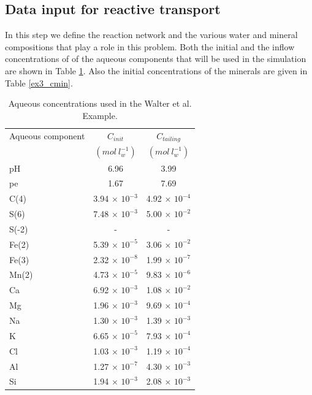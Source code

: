 \subsection[Data input for reactive transport]{Data input for reactive transport}

In this step we define the reaction network and the various water and mineral compositions that play a role in this problem. Both the initial and the inflow concentrations of of the aqueous components that will be used in the simulation are shown in Table \ref{ex3_caqu}. Also the initial concentrations of the minerals are
given in Table \ref{ex3_cmin}. 

\begin{table}
\caption{Aqueous concentrations used in the Walter et al. Example.}
\begin{center}
\begin{tabular}{l c c}
\hline
Aqueous  component        & $C_{init}$ & $C_{tailing}$      \\
                  & $(mol\ l^{-1}_w)$   & $(mol\ l^{-1}_w)$      \\ \hline
pH              &   6.96    &  3.99           \\
pe              &   1.67    &  7.69           \\
C(4)            &  3.94 $\times$ $10^{-3}$ & 4.92 $\times$ $10^{-4}$   \\
S(6)            &  7.48 $\times$ $10^{-3}$ & 5.00 $\times$ $10^{-2}$   \\
S(-2)           &     -             &     -              \\
Fe(2)           &  5.39 $\times$ $10^{-5}$ & 3.06 $\times$ $10^{-2}$   \\
Fe(3)           &  2.32 $\times$ $10^{-8}$ & 1.99 $\times$ $10^{-7}$   \\
Mn(2)           &  4.73 $\times$ $10^{-5}$ & 9.83 $\times$ $10^{-6}$   \\
Ca              &  6.92 $\times$ $10^{-3}$ & 1.08 $\times$ $10^{-2}$   \\
Mg              &  1.96 $\times$ $10^{-3}$ & 9.69 $\times$ $10^{-4}$   \\
Na              &  1.30 $\times$ $10^{-3}$ & 1.39 $\times$ $10^{-3}$   \\
K               &  6.65 $\times$ $10^{-5}$ & 7.93 $\times$ $10^{-4}$   \\
Cl              &  1.03 $\times$ $10^{-3}$ & 1.19 $\times$ $10^{-4}$   \\
Al              &  1.27 $\times$ $10^{-7}$ & 4.30 $\times$ $10^{-3}$   \\
Si              &  1.94 $\times$ $10^{-3}$ & 2.08 $\times$ $10^{-3}$   \\ \hline
\end{tabular}
\label{ex3_caqu}
\end{center}
\end{table}

